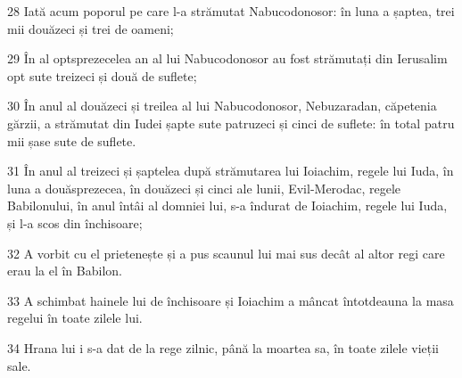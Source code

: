 \par 28 Iată acum poporul pe care l-a strămutat Nabucodonosor: în luna a șaptea, trei mii douăzeci și trei de oameni;
\par 29 În al optsprezecelea an al lui Nabucodonosor au fost strămutați din Ierusalim opt sute treizeci și două de suflete;
\par 30 În anul al douăzeci și treilea al lui Nabucodonosor, Nebuzaradan, căpetenia gărzii, a strămutat din Iudei șapte sute patruzeci și cinci de suflete: în total patru mii șase sute de suflete.
\par 31 În anul al treizeci și șaptelea după strămutarea lui Ioiachim, regele lui Iuda, în luna a douăsprezecea, în douăzeci și cinci ale lunii, Evil-Merodac, regele Babilonului, în anul întâi al domniei lui, s-a îndurat de Ioiachim, regele lui Iuda, și l-a scos din închisoare;
\par 32 A vorbit cu el prietenește și a pus scaunul lui mai sus decât al altor regi care erau la el în Babilon.
\par 33 A schimbat hainele lui de închisoare și Ioiachim a mâncat întotdeauna la masa regelui în toate zilele lui.
\par 34 Hrana lui i s-a dat de la rege zilnic, până la moartea sa, în toate zilele vieții sale.


